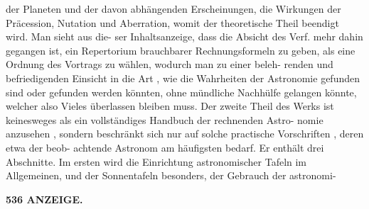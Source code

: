 \documentclass[12pt,a4paper]{article}
\begin{document}
der  Planeten  und  der  davon  abhängenden  Erscheinungen,  die  Wirkungen  der Präcession,  Nutation  und  Aberration,  womit  der  theoretische  Theil  beendigt  wird.  Man  sieht  aus  die- ser Inhaltsanzeige,  dass  die  Absicht  des  Verf.  mehr  dahin  gegangen  ist,  ein  Repertorium  brauchbarer Rechnungsformeln  zu  geben,  als  eine  Ordnung  des  Vortrags  zu  wählen,  wodurch  man  zu  einer  beleh- renden und  befriedigenden  Einsicht  in  die  Art ,  wie  die  Wahrheiten  der  Astronomie  gefunden  sind  oder gefunden  werden  könnten,  ohne  mündliche  Nachhülfe  gelangen  könnte,  welcher  also  Vieles  überlassen bleiben  muss. Der  zweite  Theil  des  Werks  ist  keinesweges  als  ein  vollständiges  Handbuch  der  rechnenden  Astro- nomie anzusehen ,  sondern  beschränkt  sich  nur  auf  solche  practische  Vorschriften ,  deren  etwa  der  beob- achtende Astronom  am  häufigsten  bedarf.  Er  enthält  drei  Abschnitte.  Im  ersten  wird  die  Einrichtung astronomischer  Tafeln  im  Allgemeinen,  und   der  Sonnentafeln   besonders,  der  Gebrauch   der  astronomi-

\vspace{0.5em}


\noindent\textbf{536  ANZEIGE.}
\end{document}
